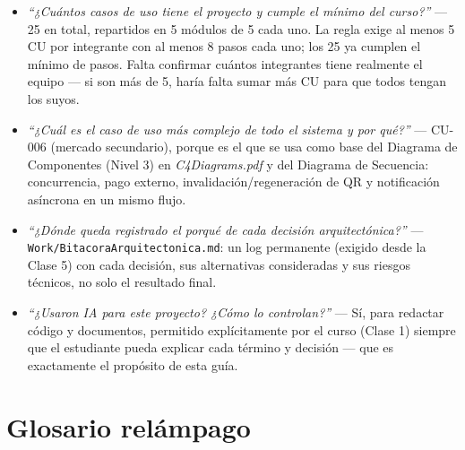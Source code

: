 \documentclass[12pt,a4paper]{article}
\begin{document}
\begin{pregunta}
\begin{itemize}
\item \textit{``¿Cuántos casos de uso tiene el proyecto y cumple el mínimo del curso?''} --- 25 en
total, repartidos en 5 módulos de 5 cada uno. La regla exige al menos 5 CU por integrante con al
menos 8 pasos cada uno; los 25 ya cumplen el mínimo de pasos. Falta confirmar cuántos integrantes
tiene realmente el equipo --- si son más de 5, haría falta sumar más CU para que todos tengan los
suyos.
\item \textit{``¿Cuál es el caso de uso más complejo de todo el sistema y por qué?''} --- CU-006
(mercado secundario), porque es el que se usa como base del Diagrama de Componentes (Nivel 3) en
\textit{C4Diagrams.pdf} y del Diagrama de Secuencia: concurrencia, pago externo,
invalidación/regeneración de QR y notificación asíncrona en un mismo flujo.
\item \textit{``¿Dónde queda registrado el porqué de cada decisión arquitectónica?''} ---
\texttt{Work/BitacoraArquitectonica.md}: un log permanente (exigido desde la Clase 5) con cada
decisión, sus alternativas consideradas y sus riesgos técnicos, no solo el resultado final.
\item \textit{``¿Usaron IA para este proyecto? ¿Cómo lo controlan?''} --- Sí, para redactar código y
documentos, permitido explícitamente por el curso (Clase 1) siempre que el estudiante pueda explicar
cada término y decisión --- que es exactamente el propósito de esta guía.
\end{itemize}
\end{pregunta}

\section{Glosario relámpago}
\end{document}
